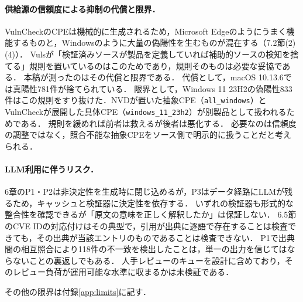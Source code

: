 \paragraph{供給源の信頼度による抑制の代償と限界．}
VulnCheckのCPEは機械的に生成されるため，Microsoft Edgeのようにうまく機能するものと，Windowsのように大量の偽陽性を生むものが混在する（7.2節(2)(4)）．
Vulsが「検証済みソースが製品を定義していれば補助的ソースの検知を捨てる」規則を置いているのはこのためであり，規則そのものは必要な妥協である．
本稿が測ったのはその代償と限界である．
代償として，macOS 10.13.6では真陽性781件が捨てられている．
限界として，Windows 11 23H2の偽陽性833件はこの規則をすり抜けた．NVDが置いた抽象CPE（\texttt{all\_windows}）とVulnCheckが展開した具体CPE（\texttt{windows\_11\_23h2}）が別製品として扱われるためである．
規則を緩めれば前者は救えるが後者は悪化する．
必要なのは信頼度の調整ではなく，照合不能な抽象CPEをソース側で明示的に扱うことだと考えられる．

\paragraph{LLM利用に伴うリスク．}
6章のP1・P2は非決定性を生成時に閉じ込めるが，P3はデータ経路にLLMが残るため，キャッシュと検証器に決定性を依存する．
いずれの検証器も形式的な整合性を確認できるが「原文の意味を正しく解釈したか」は保証しない．
6.5節のCVE IDの対応付けはその典型で，引用が出典に逐語で存在することは検査できても，その出典が当該エントリのものであることは検査できない．
P1で出典間の相互照合により118件の不一致を検出したことは，単一の出力を信じてはならないことの裏返しでもある．
人手レビューのキューを設計に含めており，そのレビュー負荷が運用可能な水準に収まるかは未検証である．

その他の限界は付録\ref{app:limits}に記す．

